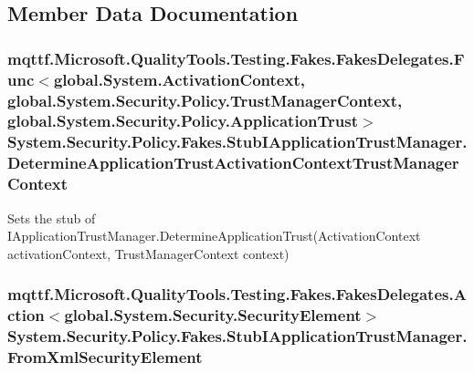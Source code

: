 \subsection{Member Data Documentation}
\hypertarget{class_system_1_1_security_1_1_policy_1_1_fakes_1_1_stub_i_application_trust_manager_a54495b88bbf0d63d242856da0fa9f6df}{
\subsubsection[{Determine\-Application\-Trust\-Activation\-Context\-Trust\-Manager\-Context}]{\setlength{\rightskip}{0pt plus 5cm}mqttf.\-Microsoft.\-Quality\-Tools.\-Testing.\-Fakes.\-Fakes\-Delegates.\-Func$<$global.\-System.\-Activation\-Context, global.\-System.\-Security.\-Policy.\-Trust\-Manager\-Context, global.\-System.\-Security.\-Policy.\-Application\-Trust$>$ System.\-Security.\-Policy.\-Fakes.\-Stub\-I\-Application\-Trust\-Manager.\-Determine\-Application\-Trust\-Activation\-Context\-Trust\-Manager\-Context}}\label{class_system_1_1_security_1_1_policy_1_1_fakes_1_1_stub_i_application_trust_manager_a54495b88bbf0d63d242856da0fa9f6df}


Sets the stub of I\-Application\-Trust\-Manager.\-Determine\-Application\-Trust(\-Activation\-Context activation\-Context, Trust\-Manager\-Context context)

\hypertarget{class_system_1_1_security_1_1_policy_1_1_fakes_1_1_stub_i_application_trust_manager_ab14590f083658a7e77ef835f0d8b7916}{
\subsubsection[{From\-Xml\-Security\-Element}]{\setlength{\rightskip}{0pt plus 5cm}mqttf.\-Microsoft.\-Quality\-Tools.\-Testing.\-Fakes.\-Fakes\-Delegates.\-Action$<$global.\-System.\-Security.\-Security\-Element$>$ System.\-Security.\-Policy.\-Fakes.\-Stub\-I\-Application\-Trust\-Manager.\-From\-Xml\-Security\-Element}}\label{class_system_1_1_security_1_1_policy_1_1_fakes_1_1_stub_i_application_trust_manager_ab14590f083658a7e77ef835f0d8b7916}


